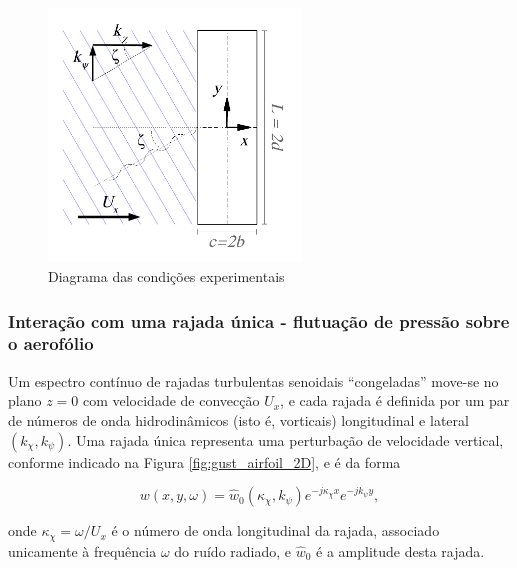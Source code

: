 \documentclass[a4paper, 11pt, twoside]{article}
\begin{document}
\begin{figure}[htbp]
	\centering
	\includegraphics[width=0.6\textwidth]{../figures/Oblique_Gust_aerofoil.pdf}
	\caption{Diagrama das condições experimentais}
	\label{fig:experimental_setup}
\end{figure}

\subsubsection{Interação com uma rajada única - flutuação de pressão sobre o aerofólio}

Um espectro contínuo de rajadas turbulentas senoidais ``congeladas'' move-se no plano $z=0$ com velocidade de convecção $U_x$, e cada rajada é definida por um par de números de onda hidrodinâmicos (isto é, vorticais) longitudinal e lateral $(k_\chi, k_\psi)$. Uma rajada única representa uma perturbação de velocidade vertical, conforme indicado na Figura \ref{fig:gust_airfoil_2D}, e é da forma

\begin{equation}
w(x, y, \omega) = \hat{w}_0(\kappa_\chi, k_\psi) e^{-j\kappa_\chi x} e^{-j k_\psi y },
\end{equation}

\noindent onde $\kappa_\chi = \omega/U_x$ é o número de onda longitudinal da rajada, associado unicamente à frequência $\omega$ do ruído radiado, e $\hat{w}_0$ é a amplitude desta rajada. %
\end{document}

